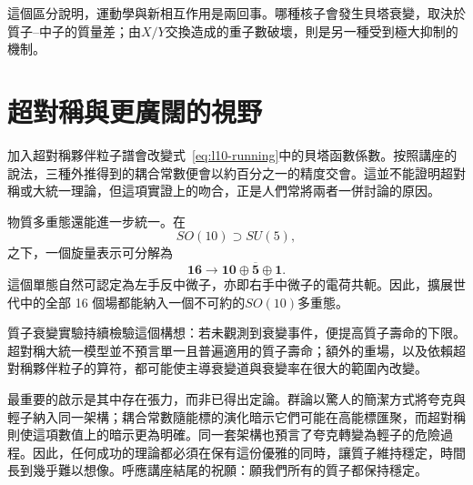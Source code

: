 這個區分說明，運動學與新相互作用是兩回事。哪種核子會發生貝塔衰變，取決於質子--中子的質量差；由\(X/Y\)交換造成的重子數破壞，則是另一種受到極大抑制的機制。

\section{超對稱與更廣闊的視野}

加入超對稱夥伴粒子譜會改變式~\eqref{eq:l10-running}中的貝塔函數係數。按照講座的說法，三種外推得到的耦合常數便會以約百分之一的精度交會。這並不能證明超對稱或大統一理論，但這項實證上的吻合，正是人們常將兩者一併討論的原因。

物質多重態還能進一步統一。在
\begin{equation}
SO(10)\supset SU(5),
\end{equation}
之下，一個旋量表示可分解為
\begin{equation}
\mathbf{16}
\longrightarrow
\mathbf{10}\oplus\overline{\mathbf5}\oplus\mathbf1.
\label{eq:l10-so10}
\end{equation}
這個單態自然可認定為左手反中微子，亦即右手中微子的電荷共軛。因此，擴展世代中的全部 16 個場都能納入一個不可約的\(SO(10)\)多重態。

質子衰變實驗持續檢驗這個構想：若未觀測到衰變事件，便提高質子壽命的下限。超對稱大統一模型並不預言單一且普遍適用的質子壽命；額外的重場，以及依賴超對稱夥伴粒子的算符，都可能使主導衰變道與衰變率在很大的範圍內改變。


最重要的啟示是其中存在張力，而非已得出定論。群論以驚人的簡潔方式將夸克與輕子納入同一架構；耦合常數隨能標的演化暗示它們可能在高能標匯聚，而超對稱則使這項數值上的暗示更為明確。同一套架構也預言了夸克轉變為輕子的危險過程。因此，任何成功的理論都必須在保有這份優雅的同時，讓質子維持穩定，時間長到幾乎難以想像。呼應講座結尾的祝願：願我們所有的質子都保持穩定。
